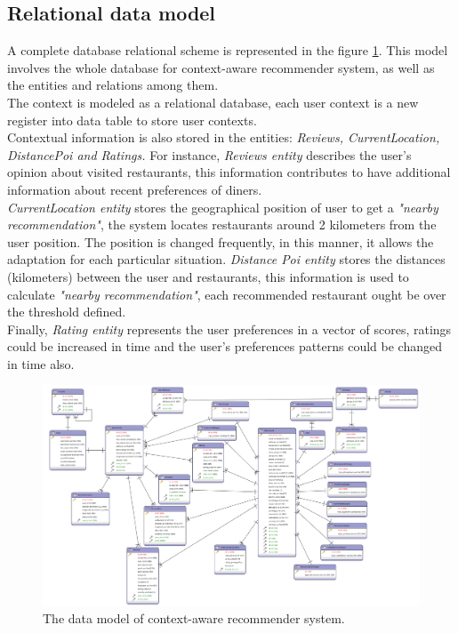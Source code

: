 \subsection{Relational data model} 

A complete database relational scheme is represented in the figure
\ref{fig:datamodel}. This model involves the whole database for
context-aware recommender system, as well as the entities and
relations among them. \\The context is modeled as a relational database,
each user context is a new register into data table to store user
contexts.\\Contextual information is also stored in the entities:
\textit{Reviews, CurrentLocation, DistancePoi and Ratings.} For
instance, \textit{Reviews entity} describes the user’s opinion about
visited restaurants, this information contributes to have additional
information about recent preferences of diners.\\   
\textit{CurrentLocation entity} stores the geographical position of
user to get a \textit{"nearby recommendation"}, the system locates
restaurants around 2 kilometers from the user position. The position
is changed frequently, in this manner, it allows the adaptation for
each particular situation. \textit{Distance Poi entity} stores the
distances (kilometers) between the user and restaurants, this
information is used to calculate \textit{"nearby recommendation"}, 
each recommended restaurant ought be over the threshold defined.\\   
Finally, \textit{Rating entity} represents the user preferences 
in a vector of scores, ratings could be increased in time and 
the user's preferences patterns could be changed in time also.
\begin{landscape} 
\begin{figure}[!h] 
\captionsetup{font=footnotesize}
\centering
\includegraphics[width=1.3\textwidth]{img/recomet.png}
\caption{The data model of context-aware recommender system.}
\label{fig:datamodel}    
\end{figure}
\end{landscape}

